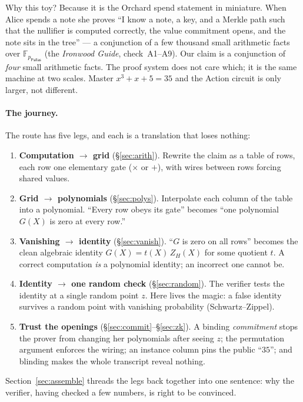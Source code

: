 \documentclass[11pt,a4paper]{article}
\theoremstyle{definition}
\newcommand{\F}{\mathbb{F}}
\newcommand{\ZH}{Z_H}
\begin{document}
Why this toy? Because it is the Orchard spend statement in miniature. When Alice
spends a note she proves ``I know a note, a key, and a Merkle path such that
the nullifier is computed correctly, the value commitment opens, and the note
sits in the tree'' --- a conjunction of a few thousand small arithmetic facts
over $\F_{p_{\mathsf{Pallas}}}$ (the \emph{Ironwood Guide}, check~A1--A9). Our claim is
a conjunction of \emph{four} small arithmetic facts. The proof system does not
care which; it is the same machine at two scales. Master $x^3 + x + 5 = 35$ and
the Action circuit is only larger, not different.

\paragraph{The journey.} The route has five legs, and each is a translation
that loses nothing:
\begin{enumerate}[leftmargin=*,itemsep=1pt]
\item \textbf{Computation $\to$ grid} (\S\ref{sec:arith}). Rewrite the claim as
a table of rows, each row one elementary gate ($\times$ or $+$), with wires
between rows forcing shared values.
\item \textbf{Grid $\to$ polynomials} (\S\ref{sec:polys}). Interpolate each
column of the table into a polynomial. ``Every row obeys its gate'' becomes
``one polynomial $G(X)$ is zero at every row.''
\item \textbf{Vanishing $\to$ identity} (\S\ref{sec:vanish}). ``$G$ is zero on
all rows'' becomes the clean algebraic identity $G(X) = t(X)\,\ZH(X)$ for some
quotient $t$. A correct computation \emph{is} a polynomial identity; an
incorrect one cannot be.
\item \textbf{Identity $\to$ one random check} (\S\ref{sec:random}). The
verifier tests the identity at a single random point $z$. Here lives the
magic: a false identity survives a random point with vanishing probability
(Schwartz--Zippel).
\item \textbf{Trust the openings} (\S\ref{sec:commit}--\S\ref{sec:zk}). A
binding \emph{commitment} stops the prover from changing her polynomials after
seeing $z$; the permutation argument enforces the wiring; an instance column
pins the public ``$35$''; and blinding makes the whole transcript reveal
nothing.
\end{enumerate}
Section~\ref{sec:assemble} threads the legs back together into one sentence:
why the verifier, having checked a few numbers, is right to be convinced.
\end{document}
